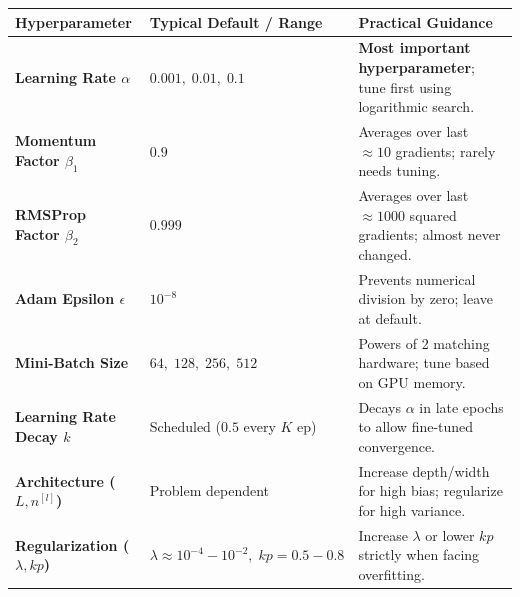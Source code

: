\documentclass[10pt,a4paper]{article}
\begin{document}
\par\vspace{1pt}
\begin{center}
\footnotesize
\setlength{\tabcolsep}{4pt}
\begin{tabularx}{\textwidth}{p{}p{}>{\raggedright\arraybackslash}X}
\toprule
\rowcolor{lightbg}
\textbf{Hyperparameter} & \textbf{Typical Default / Range} & \textbf{Practical Guidance} \\
\midrule
\textbf{Learning Rate $\alpha$} & $0.001, \; 0.01, \; 0.1$ & \textbf{Most important hyperparameter}; tune first using logarithmic search. \\
\midrule
\textbf{Momentum Factor $\beta_1$} & $0.9$ & Averages over last $\approx 10$ gradients; rarely needs tuning. \\
\midrule
\textbf{RMSProp Factor $\beta_2$} & $0.999$ & Averages over last $\approx 1000$ squared gradients; almost never changed. \\
\midrule
\textbf{Adam Epsilon $\epsilon$} & $10^{-8}$ & Prevents numerical division by zero; leave at default. \\
\midrule
\textbf{Mini-Batch Size} & $64, \; 128, \; 256, \; 512$ & Powers of 2 matching hardware; tune based on GPU memory. \\
\midrule
\textbf{Learning Rate Decay $k$} & Scheduled ($0.5$ every $K$ ep) & Decays $\alpha$ in late epochs to allow fine-tuned convergence. \\
\midrule
\textbf{Architecture ($L, n^{[l]}$)} & Problem dependent & Increase depth/width for high bias; regularize for high variance. \\
\midrule
\textbf{Regularization ($\lambda, kp$)} & $\lambda \approx 10^{-4}-10^{-2}, \; kp=0.5-0.8$ & Increase $\lambda$ or lower $kp$ strictly when facing overfitting. \\
\bottomrule
\end{tabularx}
\end{center}
\end{document}
